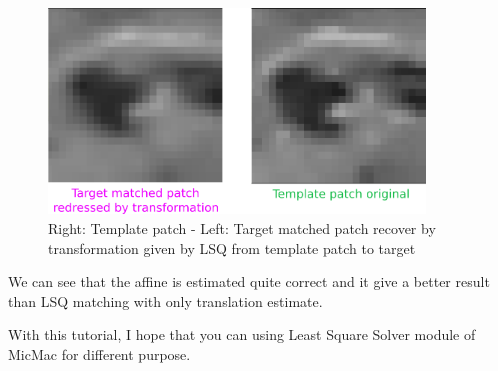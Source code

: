 \documentclass[twoside]{article}
\begin{document}
\begin{figure}[h] 
\centering
\includegraphics[width=10cm]{match_target_TrsAFF.png}
\caption{Right: Template patch - Left: Target matched patch recover by transformation given by LSQ from template patch to target}
\label{fig:2.4}
\centering
\end{figure}
We can see that the affine is estimated quite correct and it give a better result than LSQ matching with only translation estimate.

With this tutorial, I hope that you can using Least Square Solver module of MicMac for different purpose.
\end{document}
